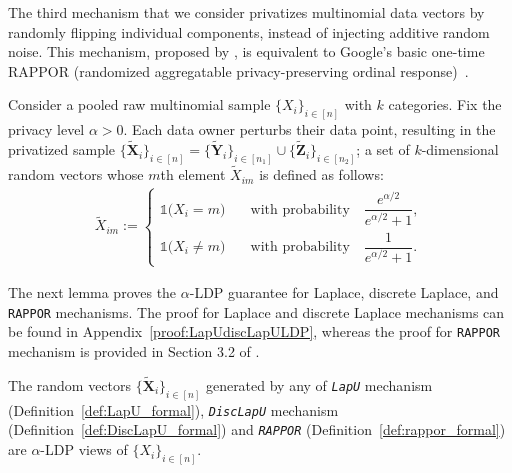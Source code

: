 \documentclass[twoside,11pt]{article}
\newcommand{\rvOne}{X}
\newcommand{\vectorize}[1]{\mathbf{#1}}
\newcommand{\rvX}{X} %
\newcommand{\rVecX}{\vectorize{\rvX}}
\newcommand{\rVecXPriv}{\tilde{\rVecX}} %
\newcommand{\rvY}{Y}
\newcommand{\rVecY}{\vectorize{\rvY}}
\newcommand{\rvZ}{Z}
\newcommand{\rVecZ}{\vectorize{\rvZ}}
\newcommand{\sampleIndexOne}{i}
\newcommand{\alphabetSize}{k} %
\newcommand{\vectorIndex}{m}
\newcommand{\privacyParameter}{\alpha} %
\begin{document}
\begin{itemize}
The third mechanism that we consider privatizes multinomial data vectors by randomly flipping individual components, instead of injecting additive random noise.
This mechanism, proposed by \citet{duchi2013local}, is equivalent to Google's basic one-time RAPPOR (randomized aggregatable privacy-preserving ordinal response)~\citep{erlingsson_rappor_2014}.
\begin{definition} \label{def:rappor_formal}
	Consider a pooled raw multinomial sample $\{X_i\}_{i \in [n]}$ with $\alphabetSize$ categories. Fix the privacy level $\privacyParameter>0$.  Each data owner perturbs their data point, resulting in the privatized sample $\{\tilde{\rVecX}_{i}\}_{i \in [n]} = \{\tilde{\rVecY}_i\}_{i\in [n_1]} \cup \{\tilde{\rVecZ}_i\}_{i \in [n_2]}$; a set of 
	$\alphabetSize$-dimensional random vectors whose $\vectorIndex$th element $\tilde{\rvOne}_{im}$ is defined as follows:
	\begin{align*}
		\tilde{\rvOne}_{\sampleIndexOne \vectorIndex}
		:=
		\begin{cases}
			\mathds{1}
			\bigl(
			\rvX_{\sampleIndexOne} = \vectorIndex
			\bigr)
			\quad & \text{with probability} \quad \dfrac{
				e^{\alpha/2}
			}{
				e^{\alpha/2}+1
			},
			\\
			\mathds{1}
			\bigl(
			\rvX_{\sampleIndexOne} \neq \vectorIndex
			\bigr)
			\quad & \text{with probability} \quad \dfrac{
				1
			}{
				e^{\alpha/2}+1
			}.
		\end{cases}
	\end{align*}
\end{definition}
The next lemma proves the $\privacyParameter$-LDP guarantee for Laplace, discrete Laplace, and \texttt{RAPPOR} mechanisms. The proof for Laplace and  discrete Laplace mechanisms can be found in Appendix~\ref{proof:LapUdiscLapULDP}, whereas the proof for \texttt{RAPPOR} mechanism is provided in Section 3.2 of \citet{duchi2013local}.

\begin{lemma} \label{lemma:LapUdiscLapULDP}
	The random vectors $\{\rVecXPriv_{i}\}_{i \in [n]}$ generated by any of \emph{\texttt{LapU}} mechanism (Definition~\ref{def:LapU_formal}), \emph{\texttt{DiscLapU}} mechanism (Definition~\ref{def:DiscLapU_formal}) and \emph{\texttt{RAPPOR}} (Definition~\ref{def:rappor_formal}) are $\privacyParameter$-LDP views of $\{X_i\}_{i \in [n]}$.
\end{lemma}


\end{itemize}
\end{document}
